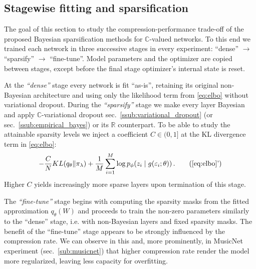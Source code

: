 \documentclass[a4paper,10pt]{article}
\newcommand{\real}{\mathbb{R}}
\newcommand{\cplx}{\mathbb{C}}
\begin{document}
\subsection{Stagewise fitting and sparsification} %
\label{sub:fitting_and_sparsification}

The goal of this section to study the compression-performance trade-off of the proposed Bayesian
sparsification methods for $\cplx$-valued networks. To this end we trained each network in
three successive stages in every experiment: ``dense'' $\to$ ``sparsify'' $\to$ ``fine-tune''.
Model parameters and the optimizer are copied between stages, except before the final stage
optimizer's internal state is reset.

At the \textit{``dense''} stage every network is fit ``as-is'', retaining its original
non-Bayesian architecture and using only the likelihood term from \eqref{eq:elbo} without
variational dropout.
%
During the \textit{``sparsify''} stage we make every layer Bayesian and apply $\cplx$-variational
dropout sec.~\ref{ssub:variational_dropout} (or sec.~\ref{ssub:empirical_bayes}) or its $\real$
counterpart. To be able to study the attainable sparsity levels we inject a coefficient $
  C \in (0, 1]
$ at the KL divergence term in \eqref{eq:elbo}:
\begin{equation}  \label{eq:elbo_with_coef}
    - \frac{C}N KL(q_{\theta} \| \pi_{\lambda})
    + \frac1{M} \sum_{i=1}^M
        \log p_{\phi}(z_i \mid g(\varepsilon_i; \theta))
    \,. \tag{\ref{eq:elbo}'}
\end{equation}
Higher $C$ yields increasingly more sparse layers upon termination of this stage.

The \textit{``fine-tune''} stage begins with computing the sparsity masks from the fitted
approximation $q_\theta(W)$ and proceeds to train the non-zero parameters similarly to
the ``dense'' stage, i.e. with non-Bayesian layers and fixed sparsity masks. 
%
The benefit of the ``fine-tune'' stage appears to be strongly influenced by the compression
rate. We can observe in this and, more prominently, in MusicNet experiment (sec.~\ref{sub:musicnet})
that higher compression rate render the model more regularized, leaving less capacity for
overfitting.
\end{document}
